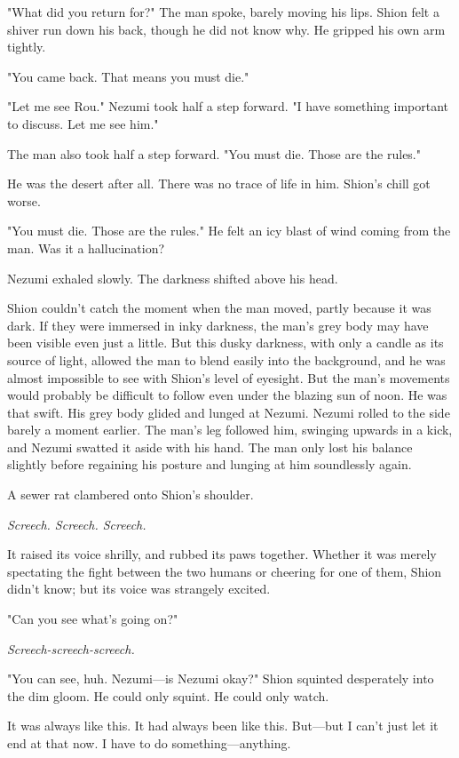 "What did you return for?" The man spoke, barely moving his lips. Shion
felt a shiver run down his back, though he did not know why. He gripped
his own arm tightly.

"You came back. That means you must die."

"Let me see Rou." Nezumi took half a step forward. "I have something
important to discuss. Let me see him."

The man also took half a step forward. "You must die. Those are the
rules."

He was the desert after all. There was no trace of life in him. Shion's
chill got worse.

"You must die. Those are the rules." He felt an icy blast of wind coming
from the man. Was it a hallucination?

Nezumi exhaled slowly. The darkness shifted above his head.

Shion couldn't catch the moment when the man moved, partly because it
was dark. If they were immersed in inky darkness, the man's grey body
may have been visible even just a little. But this dusky darkness, with
only a candle as its source of light, allowed the man to blend easily
into the background, and he was almost impossible to see with Shion's
level of eyesight. But the man's movements would probably be difficult
to follow even under the blazing sun of noon. He was that swift. His
grey body glided and lunged at Nezumi. Nezumi rolled to the side barely
a moment earlier. The man's leg followed him, swinging upwards in a
kick, and Nezumi swatted it aside with his hand. The man only lost his
balance slightly before regaining his posture and lunging at him
soundlessly again.

A sewer rat clambered onto Shion's shoulder.

\emph{Screech. Screech. Screech.}

It raised its voice shrilly, and rubbed its paws together. Whether it
was merely spectating the fight between the two humans or cheering for
one of them, Shion didn't know; but its voice was strangely excited.

"Can you see what's going on?"

\emph{Screech-screech-screech.}

"You can see, huh. Nezumi---is Nezumi okay?" Shion squinted desperately
into the dim gloom. He could only squint. He could only watch.

It was always like this. It had always been like this. But---but I can't
just let it end at that now. I have to do something---anything.

